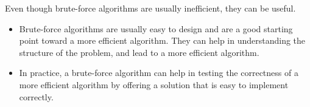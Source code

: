 \begin{cluster}
\label{grp:rmrk:design::basics::utility-of-brute-force}

\begin{remark}
\label{rmrk:design::basics::utility-of-brute-force}
Even though brute-force algorithms are usually inefficient, they can
be useful.
\begin{itemize}
\item Brute-force algorithms are usually easy to design and are a good starting point toward a more efficient algorithm.  They can help in   understanding the structure of the problem, and lead to a more efficient algorithm.

\item In practice, a brute-force algorithm can help in testing the correctness of   a more efficient algorithm by offering a solution that is easy to implement correctly.


\end{itemize}

\end{remark}
\end{cluster}

